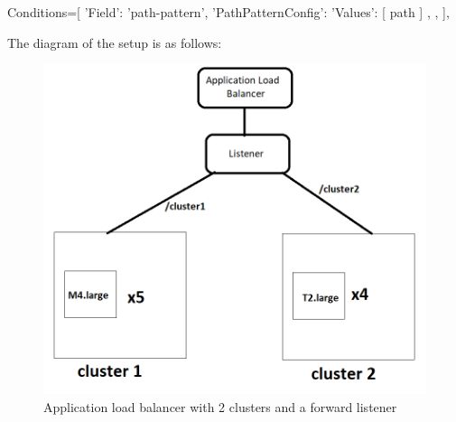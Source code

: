 \documentclass[11pt]{article}
\begin{document}
\begin{python}
    Conditions=[
        {
            'Field': 'path-pattern',
            'PathPatternConfig': {
                'Values': [
                    path
                ]
            },
        },
    ],
\end{python}
The diagram of the setup is as follows:

\begin{figure}
    \includegraphics[width=\linewidth]{cluster.png}
    \caption{Application load balancer with 2 clusters and a forward listener}
    \label{fig:setup}
\end{figure}
\end{document}
